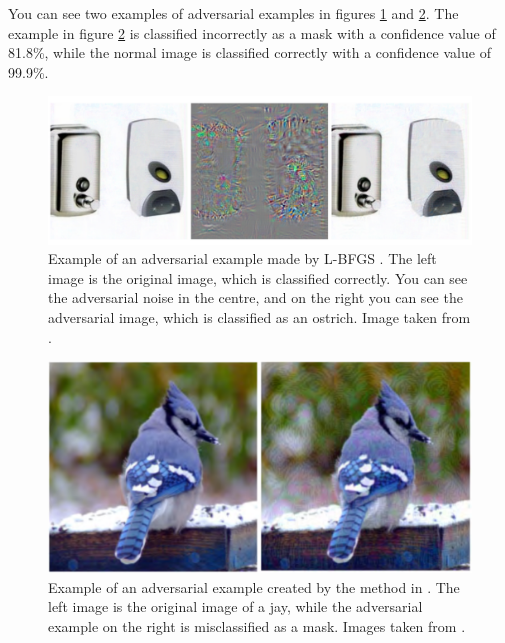 You can see two examples of adversarial examples in figures \ref{fig:lbfgs} and \ref{fig:jay_adv_example}. The example in figure \ref{fig:jay_adv_example} is classified incorrectly as a mask with a confidence value of 81.8\%, while the normal image is classified correctly with a confidence value of 99.9\%.

\begin{figure}[ht]
    \centering
    \includegraphics[width=1\textwidth]{graphics/lbfgs.PNG}
    \caption[Example of an adversarial example created by L-BFGS.]{Example of an adversarial example made by L-BFGS \cite{szegedy2014intriguing}. The left image is the original image, which is classified correctly. You can see the adversarial noise in the centre, and on the right you can see the adversarial image, which is classified as an ostrich. Image taken from \cite{szegedy2014intriguing}.}
    \label{fig:lbfgs}
\end{figure}

\begin{figure}[ht]
    \centering
    \includegraphics[width=1\textwidth]{graphics/jay_adv_example.PNG}
    \caption[Example of an adversarial example created by \cite{Moosavi-Dezfooli_2017_CVPR}.]{Example of an adversarial example created by the method in \cite{Moosavi-Dezfooli_2017_CVPR}. The left image is the original image of a jay, while the adversarial example on the right is misclassified as a mask. Images taken from \cite{akhtar}.}
    \label{fig:jay_adv_example}
\end{figure}

